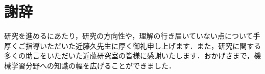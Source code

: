 \newpage
{}
{}
\section*{謝辞}
研究を進めるにあたり，研究の方向性や，理解の行き届いていない点について手厚くご指導いただいた近藤久先生に厚く御礼申し上げます．また，研究に関する多くの助言をいただいた近藤研究室の皆様に感謝いたします．おかげさまで，機械学習分野への知識の幅を広げることができました．